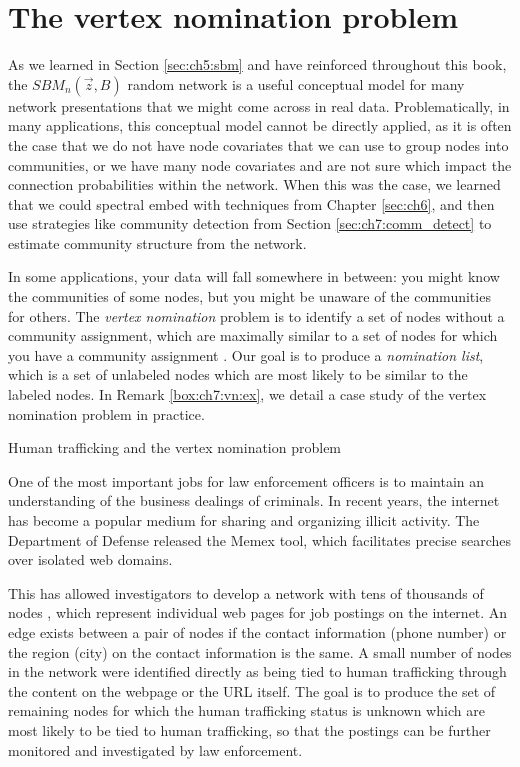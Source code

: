 \section{The vertex nomination problem}
\label{sec:ch7:vn}

As we learned in Section \ref{sec:ch5:sbm} and have reinforced throughout this book, the $SBM_n(\vec z, B)$ random network is a useful conceptual model for many network presentations that we might come across in real data. Problematically, in many applications, this conceptual model cannot be directly applied, as it is often the case that we do not have node covariates that we can use to group nodes into communities, or we have many node covariates and are not sure which impact the connection probabilities within the network. When this was the case, we learned that we could spectral embed with techniques from Chapter \ref{sec:ch6}, and then use strategies like community detection from Section \ref{sec:ch7:comm_detect} to estimate community structure from the network. 

In some applications, your data will fall somewhere in between: you might know the communities of some nodes, but you might be unaware of the communities for others. The \textit{vertex nomination} problem is to identify a set of nodes without a community assignment, which are maximally similar to a set of nodes for which you have a community assignment \cite{Fishkind2015Sep}. Our goal is to produce a \textit{nomination list}, which is a set of unlabeled nodes which are most likely to be similar to the labeled nodes. In Remark \ref{box:ch7:vn:ex}, we detail a case study of the vertex nomination problem in practice.

\begin{floatingbox}[h]\caption{Human trafficking and the vertex nomination problem}
\label{box:ch7:vn:ex}
One of the most important jobs for law enforcement officers is to maintain an understanding of the business dealings of criminals. In recent years, the internet has become a popular medium for sharing and organizing illicit activity. The Department of Defense released the Memex tool, which facilitates precise searches over isolated web domains. 

This has allowed investigators to develop a network with tens of thousands of nodes \cite{Fishkind2019Mar,Yoder2018Feb}, which represent individual web pages for job postings on the internet. An edge exists between a pair of nodes if the contact information (phone number) or the region (city) on the contact information is the same. A small number of nodes in the network were identified directly as being tied to human trafficking through the content on the webpage or the URL itself. The goal is to produce the set of remaining nodes for which the human trafficking status is unknown which are most likely to be tied to human trafficking, so that the postings can be further monitored and investigated by law enforcement. 
\end{floatingbox}

